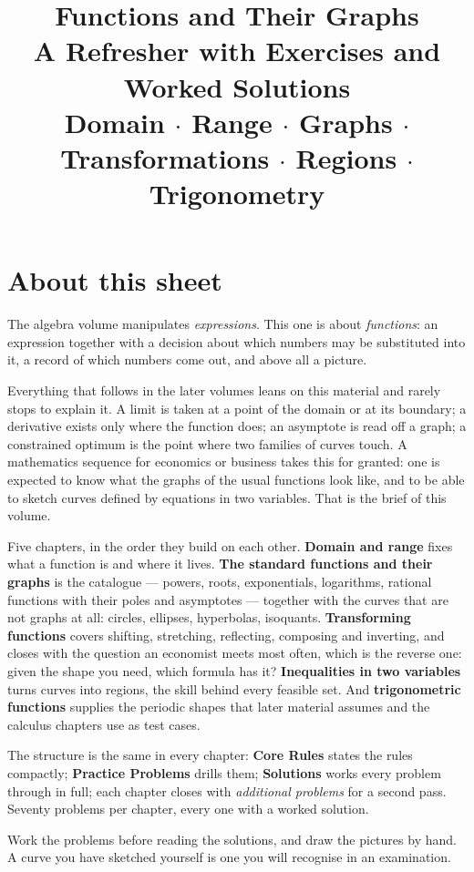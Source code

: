 \documentclass[10pt,oneside]{book}
\title{\Huge Functions and Their Graphs\\[0.4em]
  \large A Refresher with Exercises and Worked Solutions\\[0.8em]
  \normalsize Domain \(\cdot\) Range \(\cdot\) Graphs \(\cdot\)
  Transformations \(\cdot\) Regions \(\cdot\) Trigonometry}
\author{}
\date{}
\begin{document}
\frontmatter
\maketitle

\chapter*{About this sheet}

The algebra volume manipulates \emph{expressions}. This one is about
\emph{functions}: an expression together with a decision about which numbers
may be substituted into it, a record of which numbers come out, and above
all a picture.

Everything that follows in the later volumes leans on this material and
rarely stops to explain it. A limit is taken at a point of the domain or at
its boundary; a derivative exists only where the function does; an
asymptote is read off a graph; a constrained optimum is the point where two
families of curves touch. A mathematics sequence for economics or business
takes this for granted: one is expected to know what the graphs of the usual
functions look like, and to be able to sketch curves defined by equations in
two variables. That is the brief of this volume.

Five chapters, in the order they build on each other. \textbf{Domain and
range} fixes what a function is and where it lives. \textbf{The standard
functions and their graphs} is the catalogue --- powers, roots, exponentials,
logarithms, rational functions with their poles and asymptotes --- together
with the curves that are not graphs at all: circles, ellipses, hyperbolas,
isoquants. \textbf{Transforming functions} covers shifting, stretching,
reflecting, composing and inverting, and closes with the question an
economist meets most often, which is the reverse one: given the shape you
need, which formula has it? \textbf{Inequalities in two variables} turns
curves into regions, the skill behind every feasible set. And
\textbf{trigonometric functions} supplies the periodic shapes that later material
assumes and the calculus chapters use as test cases.

The structure is the same in every chapter: \textbf{Core Rules} states the
rules compactly; \textbf{Practice Problems} drills them; \textbf{Solutions}
works every problem through in full; each chapter closes with
\emph{additional problems} for a second pass. Seventy problems per chapter,
every one with a worked solution.

Work the problems before reading the solutions, and draw the pictures by
hand. A curve you have sketched yourself is one you will recognise in an
examination.

\tableofcontents

\mainmatter





\end{document}
